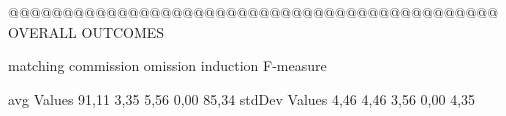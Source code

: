  @@@@@@@@@@@@@@@@@@@@@@@@@@@@@@@@@@@@@@@@@@@@@ OVERALL OUTCOMES

                matching commission   omission  induction   F-measure

avg Values      91,11       3,35       5,56       0,00       85,34        
stdDev Values    4,46       4,46       3,56       0,00        4,35        
